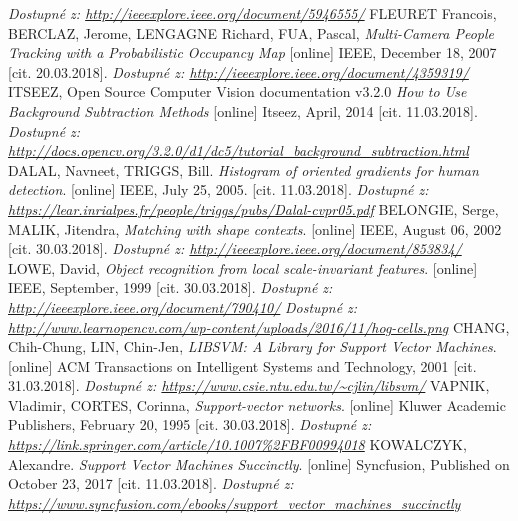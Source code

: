 \begin{thebibliography}{99}
 		\textit{Dostupné z: \url{http://ieeexplore.ieee.org/document/5946555/}}
 	 FLEURET Francois, BERCLAZ, Jerome, LENGAGNE Richard, FUA, Pascal, \textit{Multi-Camera People Tracking with a Probabilistic Occupancy Map} [online] IEEE, December 18, 2007  [cit. 20.03.2018]. 
 		\textit{Dostupné z: \url{http://ieeexplore.ieee.org/document/4359319/}}
	ITSEEZ, Open Source Computer Vision documentation v3.2.0 \textit{How to Use Background Subtraction Methods} [online] Itseez, April, 2014 [cit. 11.03.2018].
		\textit{Dostupné z: \url{http://docs.opencv.org/3.2.0/d1/dc5/tutorial_background_subtraction.html}}
	 {DALAL, Navneet, TRIGGS, Bill. \textit{Histogram of oriented gradients for human detection}. [online] IEEE, July 25, 2005. [cit. 11.03.2018].
		\textit{Dostupné z: \url{https://lear.inrialpes.fr/people/triggs/pubs/Dalal-cvpr05.pdf}}}
	 BELONGIE, Serge, MALIK, Jitendra, \textit{Matching with shape contexts}. [online] IEEE, August 06, 2002 [cit. 30.03.2018]. 
 		\textit{Dostupné z: \url{http://ieeexplore.ieee.org/document/853834/}}
 	 LOWE, David, \textit{Object recognition from local scale-invariant features}. [online] IEEE, September, 1999 [cit. 30.03.2018]. 
 		\textit{Dostupné z: \url{http://ieeexplore.ieee.org/document/790410/}}
	 \textit{Dostupné z: \url{http://www.learnopencv.com/wp-content/uploads/2016/11/hog-cells.png}}
	  CHANG, Chih-Chung, LIN, Chin-Jen, \textit{LIBSVM: A Library for Support Vector Machines}. [online] ACM Transactions on Intelligent Systems and Technology, 2001 [cit. 31.03.2018]. 
 	\textit{Dostupné z: \url{https://www.csie.ntu.edu.tw/~cjlin/libsvm/}}
	 VAPNIK, Vladimir, CORTES, Corinna, \textit{Support-vector networks}. [online] Kluwer Academic Publishers, February 20, 1995 [cit. 30.03.2018]. 
 		\textit{Dostupné z: \url{https://link.springer.com/article/10.1007\%2FBF00994018}}
	 KOWALCZYK, Alexandre.  \textit{Support Vector Machines Succinctly}.  [online] Syncfusion, Published on October 23, 2017 [cit. 11.03.2018]. 
		\textit{Dostupné z: \url{https://www.syncfusion.com/ebooks/support_vector_machines_succinctly}}


\end{thebibliography}
